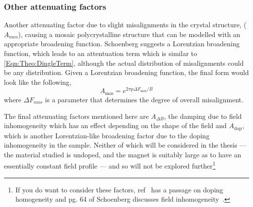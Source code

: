 \subsubsection{Other attenuating factors}

Another attenuating factor due to slight misalignments in the crystal structure, ($A_{mos}$), causing a mosaic polycrystalline structure that can be modelled with an appropriate broadening function. Schoenberg suggests a Lorentzian broadening function, which leads to an attentuation term which is similar to \ref{Eqn:Theo:DingleTerm}, although the actual distribution of misalignments could be any distribution. Given a Lorentzian broadening function, the final form would look like the following,
\begin{equation}
  A_{\textrm{mos}} = e^{2\pi p \Delta F_{\textrm{mos}}/B}
\end{equation}
where $\Delta F_{mos}$ is a parameter that determines the degree of overall misalignment.

The final attenuating factors mentioned here are $A_{\Delta B}$, the damping due to field inhomogeneity which has an effect depending on the shape of the field and $A_{\textrm{dop}}$, which is another Lorentzian-like broadening factor due to the doping inhomogeneity in the sample. Neither of which will be considered in the thesis --- the material studied is undoped, and the magnet is suitably large as to have an essentially constant field profile --- and so will not be explored further\footnote{If you do want to consider these factors, ref~\cite{Rourke2010b} has a passage on doping homogeneity and pg. 64 of Schoenberg discusses field inhomogeneity~\cite{Schoenberg1984}.}




